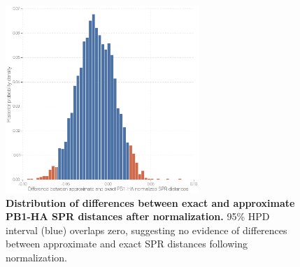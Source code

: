 \documentclass[11pt,oneside,letterpaper]{article}
\begin{document}

\begin{figure}
\centering  
\includegraphics[width=0.65\textwidth]  {supp_figures/InfB_supp_NormPB1-HA_hist.png}
\caption{\textbf{Distribution of differences between exact and approximate PB1-HA SPR distances after normalization.}
95\% HPD interval (blue) overlaps zero, suggesting no evidence of differences between approximate and exact SPR distances following normalization.}
\label{NormSPR_PB1-HA_difference}
\end{figure}

\end{document}
